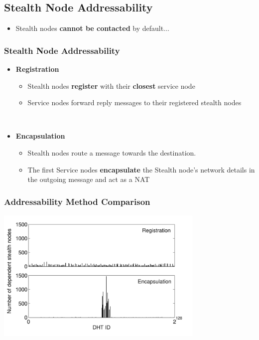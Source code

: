 \documentclass[xcolor=pdftex,dvipsnames,table]{beamer}
\begin{document}
\subsection{Stealth Node Addressability}
\begin{frame}
    \begin{itemize}
    \item{Stealth nodes \textbf{cannot be contacted} by default...}
    \end{itemize}

    \frametitle{Stealth Node Addressability}
    \begin{itemize}
        \item<1>{\textbf{Registration}}
        \begin{itemize}
        \item{Stealth nodes \textbf{register} with their \textbf{closest} service node}
        \item{Service nodes forward reply messages to their registered stealth nodes}
        \end{itemize}

    \hfill\\

    \item<2>{\textbf{Encapsulation}}
        \begin{itemize}
        \item{Stealth nodes route a message towards the destination.}
        \item{The first Service nodes \textbf{encapsulate} the Stealth node's network details in the outgoing message and act as a NAT}
        \end{itemize}
    \end{itemize}

\end{frame}

\begin{frame}
    \frametitle{Addressability Method Comparison}
    \begin{center}
    \includegraphics[width=10cm]{diagrams/Addressability}
    \end{center}
\end{frame}
\end{document}
